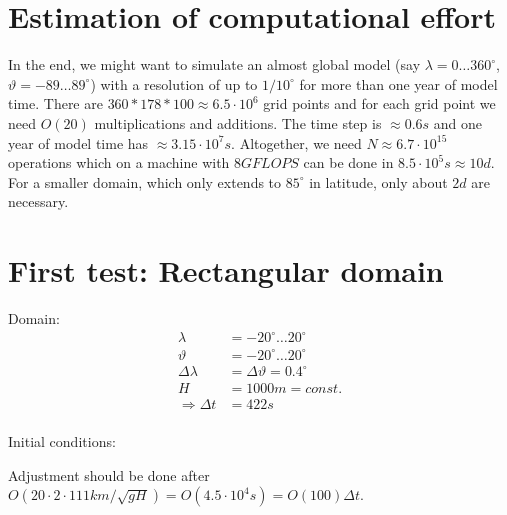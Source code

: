 \documentclass[a4paper]{article}
\begin{document}

\section{Estimation of computational effort}

In the end, we might want to simulate an almost global model 
(say $\lambda=0\ldots360^\circ$, $\vartheta=-89\ldots89^\circ$) with a resolution 
of up to $1/10^\circ$ for more than one year of model time. There are 
$360*178*100\approx 6.5\cdot10^6$ grid points and for each grid point we need $O(20)$ 
multiplications and additions. The time step is $\approx 0.6s$ and one year of model time
has $\approx 3.15\cdot 10^7s$. Altogether, we need $N\approx 6.7\cdot 10^{15}$ operations which
on a machine with $8GFLOPS$ can be done in $8.5\cdot 10^5s\approx 10d$. For a smaller domain, which
only extends to $85^\circ$ in latitude, only about $2d$ are necessary.


\section{First test: Rectangular domain}

Domain:
\begin{equation}
  \begin{split}
    \lambda & = -20^\circ \ldots 20^\circ \\
    \vartheta & = -20^\circ \ldots 20^\circ \\
    \Delta \lambda & = \Delta \vartheta = 0.4^\circ \\
    H & = 1000m = const. \\
    \Rightarrow \Delta t & = 422 s \\
  \end{split}
\end{equation}

Initial conditions:

Adjustment should be done after $O(20 \cdot 2 \cdot 111km / \sqrt{gH}) = 
O(4.5\cdot 10^4s) = O(100) \Delta t$.


%
%
\end{document}
